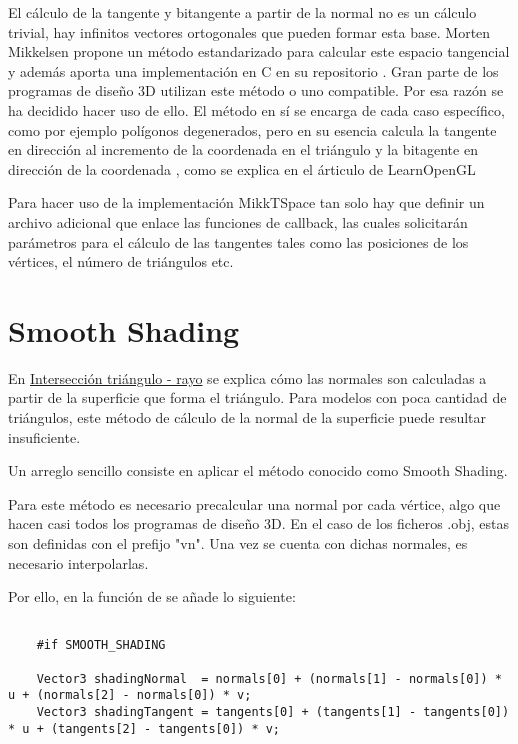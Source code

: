 El cálculo de la tangente y bitangente a partir de la normal no es un cálculo trivial, hay infinitos vectores ortogonales que pueden formar esta base. Morten Mikkelsen \cite{mikkelsen2008simulation} propone un método estandarizado para calcular este espacio tangencial y además aporta una implementación en C en su repositorio \cite{mikktspace}. Gran parte de los programas de diseño 3D utilizan este método o uno compatible. Por esa razón se ha decidido hacer uso de ello. El método en sí se encarga de cada caso específico, como por ejemplo polígonos degenerados, pero en su esencia calcula la tangente en dirección al incremento de la coordenada  en el triángulo y la bitagente en dirección de la coordenada , como se explica en el árticulo de LearnOpenGL \cite{learnopengl}

Para hacer uso de la implementación MikkTSpace tan solo hay que definir un archivo adicional que enlace las funciones de callback, las cuales solicitarán parámetros para el cálculo de las tangentes tales como las posiciones de los vértices, el número de triángulos etc.

	
\section{Smooth Shading}
	
En \hyperref[subsec:triintersection]{Intersección triángulo - rayo} se explica cómo las normales son calculadas a partir de la superficie que forma el triángulo. Para modelos con poca cantidad de triángulos, este método de cálculo de la normal de la superficie puede resultar insuficiente.
	
Un arreglo sencillo consiste en aplicar el método conocido como Smooth Shading. 
	
Para este método es necesario precalcular una normal por cada vértice, algo que hacen casi todos los programas de diseño 3D. En el caso de los ficheros .obj, estas son definidas con el prefijo "vn". Una vez se cuenta con dichas normales, es necesario interpolarlas. 

Por ello, en la función  de  se añade lo siguiente:

\begin{minipage}[c]{0.95\textwidth}
\begin{lstlisting}
			
	#if SMOOTH_SHADING 

    Vector3 shadingNormal  = normals[0] + (normals[1] - normals[0]) * u + (normals[2] - normals[0]) * v;
    Vector3 shadingTangent = tangents[0] + (tangents[1] - tangents[0]) * u + (tangents[2] - tangents[0]) * v;

\end{lstlisting}
\end{minipage}
	
